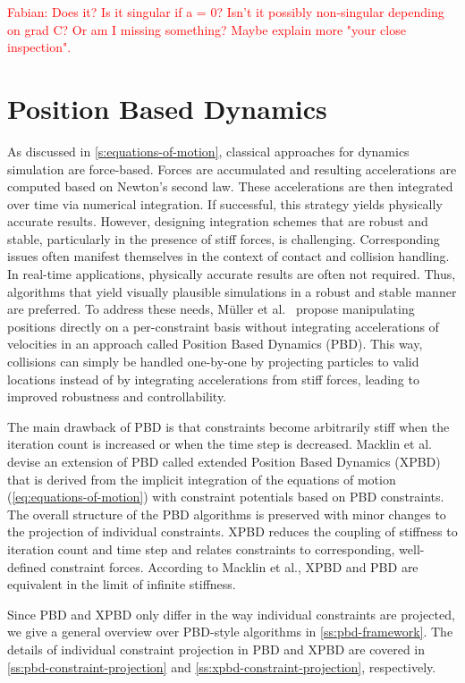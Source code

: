 \textcolor{red}{Fabian: Does it? Is it singular if a = 0? Isn't it possibly non-singular depending on grad C? Or am I missing something? 
Maybe explain more "your close inspection".}

\section{Position Based Dynamics}\label{s:pbd}
As discussed in \cref{s:equations-of-motion}, classical approaches for dynamics simulation are force-based. Forces are accumulated and 
resulting accelerations are computed based on Newton's second law. These accelerations are then integrated over time via numerical integration. 
If successful, this strategy yields physically accurate results. However, designing integration schemes that are robust and stable,
particularly in the presence of stiff forces, is challenging. Corresponding issues often manifest themselves in the context of contact and collision 
handling. In real-time applications, physically accurate results are often not required. Thus, algorithms that yield visually
plausible simulations in a robust and stable manner are preferred. To address these needs, Müller et al.\ \cite{mueller2006} propose manipulating
positions directly on a per-constraint basis without integrating accelerations of velocities in an approach called Position Based Dynamics (PBD).
This way, collisions can simply be handled one-by-one by projecting particles to valid locations instead of by integrating accelerations from 
stiff forces, leading to improved robustness and controllability. 

The main drawback of PBD is that constraints become arbitrarily stiff when the iteration count is increased or when the time step is decreased.
Macklin et al.\ \cite{macklin2016} devise an extension of PBD called extended Position Based Dynamics (XPBD) that is derived from the implicit
integration of the equations of motion (\cref{eq:equations-of-motion}) with constraint potentials based on PBD constraints. The overall structure 
of the PBD algorithms is preserved with 
minor changes to the projection of individual constraints. XPBD reduces the coupling of stiffness to iteration count and time step and relates 
constraints to corresponding, well-defined constraint forces. According to Macklin et al., XPBD and PBD are equivalent in the limit of infinite
stiffness. 

Since PBD and XPBD only differ in the way individual constraints are projected, we give a general overview over PBD-style algorithms 
in \cref{ss:pbd-framework}. 
The details of individual constraint projection in PBD and XPBD are covered in \cref{ss:pbd-constraint-projection} and 
\cref{ss:xpbd-constraint-projection}, respectively.

